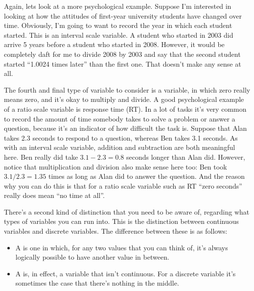 Again, lets look at a more psychological example. Suppose I'm interested in looking at how the attitudes of first-year university students have changed over time. Obviously, I'm going to want to record the year in which each student started. This is an interval scale variable. A student who started in 2003 did arrive 5 years before a student who started in 2008. However, it would be completely daft for me to divide 2008 by 2003 and say that the second student started ``1.0024 times later'' than the first one. That doesn't make any sense at all.


The fourth and final type of variable to consider is a  variable, in which zero really means zero, and it's okay to multiply and divide. A good psychological example of a ratio scale variable is response time (RT). In a lot of tasks it's very common to record the amount of time somebody takes to solve a problem or answer a question, because it's an indicator of how difficult the task is. Suppose that Alan takes 2.3 seconds to respond to a question, whereas Ben takes 3.1 seconds. As with an interval scale variable, addition and subtraction are both meaningful here. Ben really did take $3.1 - 2.3 = 0.8$ seconds longer than Alan did. However, notice that multiplication and division also make sense here too: Ben took $3.1 / 2.3 = 1.35$ times as long as Alan did to answer the question. And the reason why you can do this is that for a ratio scale variable such as RT ``zero seconds'' really does mean ``no time at all''.


There's a second kind of distinction that you need to be aware of, regarding what types of variables you can run into. This is the distinction between continuous variables and discrete variables. The difference between these is as follows:

\begin{itemize}
\item A  is one in which, for any two values that you can think of, it's always logically possible to have another value in between. 
\item A  is, in effect, a variable that isn't continuous. For a discrete variable it's sometimes the case that there's nothing in the middle.
\end{itemize}

